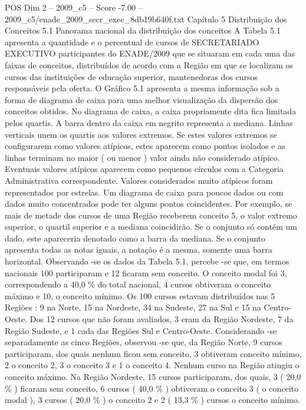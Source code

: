 \begin{textsample}{POS Dim 2 – 2009\_c5 – Score -7.00 – 2009\_c5/enade\_2009\_secr\_exec\_8db19b640f.txt}  \label{ex:f2_pos_417}
Capítulo 5 Distribuição dos Conceitos 5.1 Panorama nacional da distribuição dos conceitos A Tabela 5.1 apresenta a quantidade e o percentual de cursos de SECRETARIADO EXECUTIVO participantes do ENADE/2009 que se situaram em cada uma das faixas de conceitos, distribuídos de acordo com a Região em que se localizam os cursos das instituições de educação superior, mantenedoras dos cursos responsáveis pela oferta.
O Gráfico 5.1 apresenta a mesma informação sob a forma de diagrama de caixa para uma melhor visualização da dispersão dos conceitos obtidos.
No diagrama de caixa, a caixa propriamente dita fica limitada pelos quartis.
A barra dentro da caixa em negrito representa a mediana.
Linhas verticais unem os quartis aos valores extremos.
Se estes valores extremos se configurarem como valores atípicos, estes aparecem como pontos isolados e as linhas terminam no maior ( ou menor ) valor ainda não considerado atípico.
Eventuais valores atípicos aparecem como pequenos círculos com a Categoria Administrativa correspondente.
Valores considerados muito atípicos foram representados por estrelas.
Um diagrama de caixa para poucos dados ou com dados muito concentrados pode ter alguns pontos coincidentes.
Por exemplo, se mais de metade dos cursos de uma Região receberem conceito 5, o valor extremo superior, o quartil superior e a mediana coincidirão.
Se o conjunto só contém um dado, este apareceria denotado como a barra da mediana.
Se o conjunto apresenta todas as notas iguais, a notação é a mesma, somente uma barra horizontal.
Observando -se os dados da Tabela 5.1, percebe -se que, em termos nacionais 100 participaram e 12 ficaram sem conceito.
O conceito modal foi 3, correspondendo a 40,0 \% do total nacional, 4 cursos obtiveram o conceito máximo e 10, o conceito mínimo.
Os 100 cursos estavam distribuídos nas 5 Regiões : 9 na Norte, 15 na Nordeste, 34 na Sudeste, 27 na Sul e 15 na Centro-Oeste.
Dos 12 cursos que não foram avaliados, 3 eram da Região Nordeste, 7 da Região Sudeste, e 1 cada das Regiões Sul e Centro-Oeste.
Considerando -se separadamente as cinco Regiões, observou -se que, da Região Norte, 9 cursos participaram, dos quais nenhum ficou sem conceito, 3 obtiveram conceito mínimo, 2 o conceito 2, 3 o conceito 3 e 1 o conceito 4.
Nenhum curso na Região atingiu o conceito máximo.
Na Região Nordeste, 15 cursos participaram, dos quais, 3 ( 20,0 \% ) ficaram sem conceito, 6 cursos ( 40,0 \% ) obtiveram o conceito 3 ( o conceito modal ), 3 cursos ( 20,0 \% ) o conceito 2 e 2 ( 13,3 \% ) cursos o conceito mínimo.

\end{textsample}
